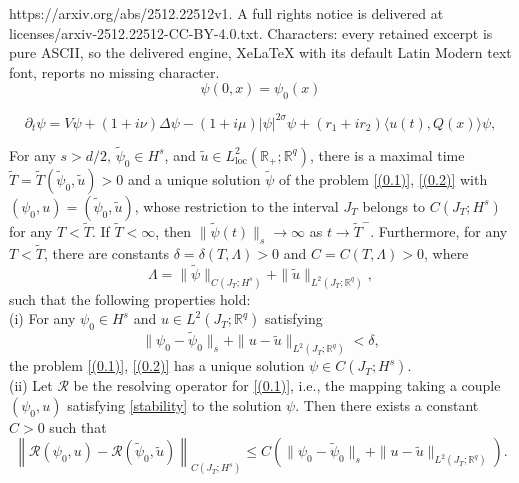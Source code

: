 \documentclass[10pt,a4paper]{amsart}
\def \leq{\leqslant}
\begin{document}
https://arxiv.org/abs/2512.22512v1. A full rights notice is delivered at licenses/arxiv-2512.22512-CC-BY-4.0.txt. Characters: every retained excerpt is pure ASCII, so the delivered engine, XeLaTeX with its default Latin Modern text font, reports no missing character.
\begin{equation}\label{(0.2)}
\psi(0, x)=\psi_0(x)
\end{equation}

\begin{equation}\label{(0.1)}
	\partial_t \psi=V \psi+(1+i \nu) \Delta \psi-(1+i \mu)|\psi|^{2 \sigma} \psi +(r_1+i r_2) \langle u(t), Q(x)\rangle \psi ,
\end{equation}

\begin{proposition}\label{prop1.1}
For any $s>d / 2,\, \tilde{\psi}_0 \in H^s$, and $\tilde{u} \in L_{\text{loc}}^2\left(\mathbb{R}_{+} ; \mathbb{R}^q\right)$, there is a maximal time $\tilde{T}=\tilde{T}\left(\tilde{\psi}_0, \tilde{u}\right)>0$ and a unique solution $\tilde{\psi}$ of the problem \eqref{(0.1)}, \eqref{(0.2)} with $\left(\psi_0, u\right)=\left(\tilde{\psi}_0, \tilde{u}\right)$, whose restriction to the interval $J_T$ belongs to $C\left(J_T ; H^s\right)$ for any $T<\tilde{T}$. If $\tilde{T}<\infty$, then $\|\tilde{\psi}(t)\|_s \rightarrow \infty$ as $t \rightarrow \tilde{T}^{-}$. Furthermore, for any $T<\tilde{T}$, there are constants $\delta=\delta(T, \Lambda)>0$ and $C=C(T, \Lambda)>0$, where
$$
\Lambda=\|\tilde{\psi}\|_{C\left(J_T ; H^s\right)}+\|\tilde{u}\|_{L^2\left(J_T ; \mathbb{R}^q\right)},
$$
such that the following properties hold:\\
(i) For any $\psi_0 \in H^s$ and $u \in L^2\left(J_T ; \mathbb{R}^q\right)$ satisfying
\begin{equation}\label{stability}
 \|\psi_0-\tilde{\psi}_0 \|_s+\|u-\tilde{u}\|_{L^2\left(J_T ; \mathbb{R}^q\right)}<\delta,
\end{equation}
the problem \eqref{(0.1)}, \eqref{(0.2)} has a unique solution $\psi \in C\left(J_T ; H^s\right)$.\\
(ii) Let $\mathcal{R}$ be the resolving operator for \eqref{(0.1)}, i.e., the mapping taking a couple $\left(\psi_0, u\right)$ satisfying \eqref{stability} to the solution $\psi$. Then there exists a constant $C>0$ such that
\begin{equation}\label{continuity}
\left\|\mathcal{R}\left(\psi_0, u\right)-\mathcal{R}\left(\tilde{\psi}_0, \tilde{u}\right)\right\|_{C\left(J_T ; H^s\right)} \leq C\left( \|\psi_0-\tilde{\psi}_0 \|_s+\|u-\tilde{u}\|_{L^2\left(J_T ; \mathbb{R}^q\right)}\right) .
\end{equation}
\end{proposition}
\end{document}
